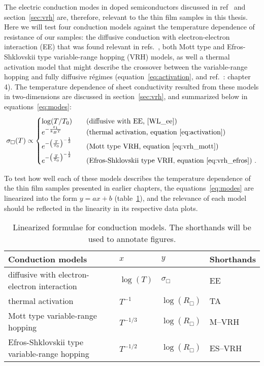 The electric conduction modes in doped semiconductors discussed in ref~\cite{schklovskii_efros} and section~\ref{sec:vrh} are, therefore, relevant to the thin film samples in this thesis. Here we will test four conduction models against the temperature dependence of resistance of our samples: the diffusive conduction with electron-electron interaction (EE) that was found relevant in refs.~\cite{Chen2011, Liu2011, Roy2013, liao2015}, both Mott type and Efros-Shklovskii type variable-range hopping (VRH) models, as well a thermal activation model that might describe the crossover between the variable-range hopping and fully diffusive r\'egimes (equation~\ref{eq:activation}, and ref.~\cite{schklovskii_efros}: chapter 4). The temperature dependence of sheet conductivity resulted from these models in two-dimensions are discussed in section~\ref{sec:vrh}, and summarized below in equations~\ref{eq:modes}:%
\begin{equation}\label{eq:modes}
    \sigma_\Box(T) \propto %
    \begin{cases}
        \log(T / T_0)  & \quad \text{(diffusive with EE, \cite{WL_ee})}\\
        e^{-\frac{\varepsilon_1}{k_B T}}   & \quad \text{(thermal activation, equation~\ref{eq:activation})}\\
        e^{-\left(\frac{T}{T_0}\right)^{-\frac{1}{3}}}   & \quad \text{(Mott type VRH, equation~\ref{eq:vrh_mott})}\\
        e^{-\left(\frac{T}{T_0}\right)^{-\frac{1}{2}}} & \quad \text{(Efros-Shklovskii type VRH, equation~\ref{eq:vrh_efros})}~.
    \end{cases}
\end{equation}%

To test how well each of these models describes the temperature dependence of the thin film samples presented in earlier chapters, the equations~\ref{eq:modes} are linearized into the form $y=ax+b$ (table~\ref{tab:models}), and the relevance of each model should be reflected in the linearity in its respective data plots.%
\begin{table}[ht]
    \centering
    \begin{tabularx}{0.95\columnwidth}[t]{l|l|l|X}
    \caption[Linearized formulae for testing conduction models]{\label{tab:models}Linearized formulae for conduction models. The shorthands will be used to annotate figures.}\\
		\hline\hline
        Conduction models & $x$ & $y$ & Shorthands\\
        \hline%
        diffusive with electron-electron interaction & $\log(T)$ & $\sigma_\Box$ & EE\\
        thermal activation & $T^{-1}$ & $\log\left(R_\Box\right)$ & TA\\
        Mott type variable-range hopping & $T^{-1/3}$ & $\log\left(R_\Box\right)$ & M--VRH\\
        Efros-Shklovskii type variable-range hopping & $T^{-1/2}$ & $\log\left(R_\Box\right)$ & ES--VRH\\
		\hline\hline
    \end{tabularx}
\end{table} %

